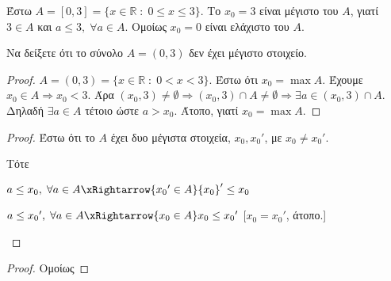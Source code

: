 \documentclass[main.tex]{subfiles}
\begin{document}
\begin{example}
    Έστω $ A = [0,3] = \{ x \in \mathbb{R} \; : \; 0 \leq x \leq 3 \} $. 
    Το $ x_{0}= 3 $ είναι μέγιστο του $A$, γιατί $ 3 \in A $ και 
    $ a \leq 3, \; \forall a \in A $. Ομοίως $ x_{0}= 0 $ είναι ελάχιστο 
    του $A$.
\end{example}

\begin{example}
    Να δείξετε ότι το σύνολο $ A = (0,3) $ δεν έχει μέγιστο στοιχείο.
\end{example}

\begin{proof}
\item {}
    $ A = (0,3) = \{ x \in \mathbb{R} \; : \; 0 < x < 3 \} $. 
    Έστω ότι $ x_{0} = \max A $. Έχουμε  $ x_{0} \in A \Rightarrow  x_{0} 
    < 3$. Άρα  $ (x_{0}, 3) \neq \emptyset \Rightarrow (x_{0},3) \cap A \neq 
    \emptyset \Rightarrow \exists a \in (x_{0},3) \cap A $. Δηλαδή $ 
    \exists a \in A$ τέτοιο ώστε $ a > x_{0} $. Άτοπο, γιατί $ x_{0}= \max A $.
\end{proof}




\begin{proof}
    Έστω ότι το $A$ έχει δυο μέγιστα στοιχεία,  $ x_{0}, {x_{0}}' $,  με 
    $ x_{0} \neq {x_{0}}'$. 

    Τότε 
    \begin{myitemize}
        \item $ a \leq x_{0}, \; \forall a \in A \xRightarrow{{x_{0}}' 
            \in A } {x_{0}}'  \leq x_{0} $ 
        \item $ a \leq {x_{0}}', \; \forall a \in A \xRightarrow{x_{0} 
            \in A } x_{0} \leq {x_{0}}' $ 
            [$ x_{0} = {x_{0}}' $, άτοπο.] 
    \end{myitemize}
\end{proof}


\begin{proof}
    Ομοίως 
\end{proof}

\end{document}
